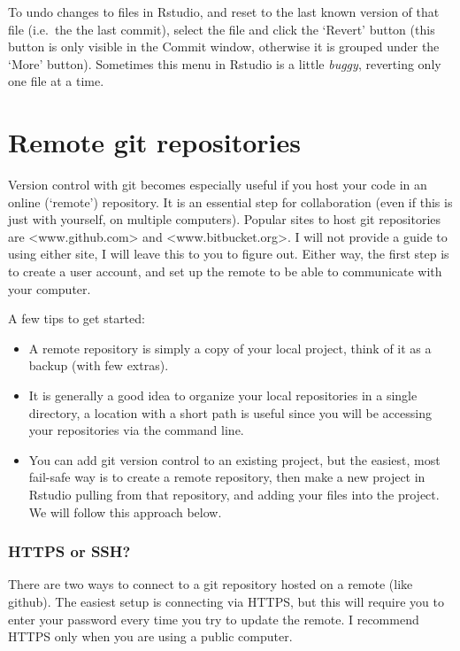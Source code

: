 \documentclass[]{book}
\providecommand{\tightlist}{%
  \setlength{\itemsep}{0pt}\setlength{\parskip}{0pt}}
\begin{document}
To undo changes to files in Rstudio, and reset to the last known version of that file (i.e.~the the last commit), select the file and click the `Revert' button (this button is only visible in the Commit window, otherwise it is grouped under the `More' button).
Sometimes this menu in Rstudio is a little \emph{buggy}, reverting only one file at a time.

\hypertarget{remotegit}{%
\section{Remote git repositories}\label{remotegit}}

Version control with git becomes especially useful if you host your code in an online (`remote') repository. It is an essential step for collaboration (even if this is just with yourself, on multiple computers). Popular sites to host git repositories are \textless www.github.com\textgreater{} and \textless www.bitbucket.org\textgreater. I will not provide a guide to using either site, I will leave this to you to figure out. Either way, the first step is to create a user account, and set up the remote to be able to communicate with your computer.

A few tips to get started:

\begin{itemize}
\tightlist
\item
  A remote repository is simply a copy of your local project, think of it as a backup (with few extras).
\item
  It is generally a good idea to organize your local repositories in a single directory, a location with a short path is useful since you will be accessing your repositories via the command line.
\item
  You can add git version control to an existing project, but the easiest, most fail-safe way is to create a remote repository, then make a new project in Rstudio pulling from that repository, and adding your files into the project. We will follow this approach below.
\end{itemize}

\hypertarget{https-or-ssh}{%
\subsubsection{HTTPS or SSH?}\label{https-or-ssh}}

There are two ways to connect to a git repository hosted on a remote (like github). The easiest setup is connecting via HTTPS, but this will require you to enter your password every time you try to update the remote. I recommend HTTPS only when you are using a public computer.
\end{document}
